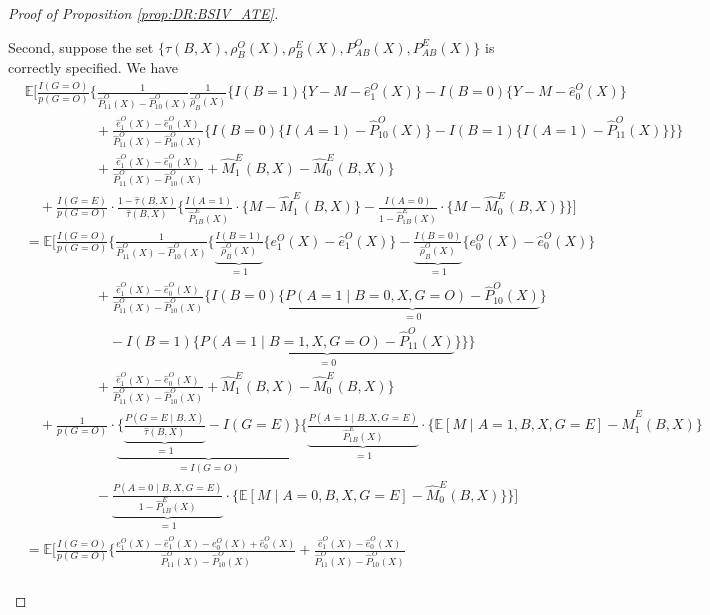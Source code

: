 \documentclass[10pt]{article}
\newcommand{\E}{\mathbb{E}}
\begin{document}
\begin{proof}[Proof of Proposition \ref{prop:DR:BSIV_ATE}]
\begin{itemize}
Second, suppose the set $\{\tau(B,X),\rho_B^O(X),\rho_B^E(X),P_{AB}^O(X),P_{AB}^E(X)\}$ is correctly specified. We have
\begingroup
\allowdisplaybreaks
{\footnotesize \begin{align*}
&\E\Big[\frac{I(G=O)}{p(G=O)}\Bigg\{\frac{1}{\hat{P}_{11}^O(X)-\hat{P}_{10}^O(X)}
\frac{1}{\hat{\rho}_B^O(X)}\bigg\{I(B=1)\{Y-M-\hat{e}_1^O(X)\}
-I(B=0)\{Y-M-\hat{e}_0^O(X)\}\\
&\quad\quad\quad\quad\quad+\frac{\hat{e}_1^O(X)-\hat{e}_0^O(X)}{\hat{P}_{11}^O(X)-\hat{P}_{10}^O(X)}\big\{I(B=0)\{I(A=1)-\hat{P}_{10}^O(X)\}-I(B=1)\{I(A=1)-\hat{P}_{11}^O(X)\}\big\}\bigg\}\\
&\quad\quad\quad\quad\quad+\frac{\hat{e}_1^O(X)-\hat{e}_0^O(X)}{\hat{P}_{11}^O(X)-\hat{P}_{10}^O(X)}+\hat{M}_{1}^{E}(B,X)-\hat{M}_{0}^{E}(B,X)\Bigg\}\\
&\quad+\frac{I(G=E)}{p(G=O)}\cdot\frac{1-\hat{\tau}(B,X)}{\hat{\tau}(B,X)}\bigg\{\frac{I(A=1)}{\hat{P}_{1B}^E(X)}\cdot\{M-\hat{M}_{1}^{E}(B,X)\}-\frac{I(A=0)}{1-\hat{P}_{1B}^E(X)}\cdot\{M-\hat{M}_{0}^{E}(B,X)\}\bigg\}\Big]\\
&=\E\Big[\frac{I(G=O)}{p(G=O)}\Bigg\{\frac{1}{\hat{P}_{11}^O(X)-\hat{P}_{10}^O(X)}
\bigg\{\underbrace{\frac{I(B=1)}{\hat{\rho}_B^O(X)}}_{=1}\{e_1^O(X)-\hat{e}_1^O(X)\}
-\underbrace{\frac{I(B=0)}{\hat{\rho}_B^O(X)}}_{=1}\{e_0^O(X)-\hat{e}_0^O(X)\}\\
&\quad\quad\quad\quad\quad+\frac{\hat{e}_1^O(X)-\hat{e}_0^O(X)}{\hat{P}_{11}^O(X)-\hat{P}_{10}^O(X)}\big\{I(B=0)\{\underbrace{P(A=1\mid B=0,X,G=O)-\hat{P}_{10}^O(X)}_{=0}\}\\
&\quad\quad\quad\quad\quad\quad-I(B=1)\{\underbrace{P(A=1\mid B=1,X,G=O)-\hat{P}_{11}^O(X)}_{=0}\}\big\}\bigg\}\\
&\quad\quad\quad\quad\quad+\frac{\hat{e}_1^O(X)-\hat{e}_0^O(X)}{\hat{P}_{11}^O(X)-\hat{P}_{10}^O(X)}+\hat{M}_{1}^{E}(B,X)-\hat{M}_{0}^{E}(B,X)\Bigg\}\\
&\quad+\frac{1}{p(G=O)}\cdot\underbrace{\Big\{\underbrace{\frac{P(G=E\mid B,X)}{\hat{\tau}(B,X)}}_{=1}-I(G=E)\Big\}}_{=I(G=O)}\bigg\{\underbrace{\frac{P(A=1\mid B,X,G=E)}{\hat{P}_{1B}^E(X)}}_{=1}\cdot\{\E[M\mid A=1,B,X,G=E]-\hat{M}_{1}^{E}(B,X)\}\\
&\quad\quad\quad\quad\quad-\underbrace{\frac{P(A=0\mid B,X,G=E)}{1-\hat{P}_{1B}^E(X)}}_{=1}\cdot\{\E[M\mid A=0,B,X,G=E]-\hat{M}_{0}^{E}(B,X)\}\bigg\}\Big]\\
&=\E\Big[\frac{I(G=O)}{p(G=O)}\Bigg\{\frac{e_1^O(X)-\hat{e}_1^O(X)-e_0^O(X)+\hat{e}_0^O(X)}{\hat{P}_{11}^O(X)-\hat{P}_{10}^O(X)}+\frac{\hat{e}_1^O(X)-\hat{e}_0^O(X)}{\hat{P}_{11}^O(X)-\hat{P}_{10}^O(X)}\\

\end{align*}}
\end{itemize}
\end{proof}
\end{document}
